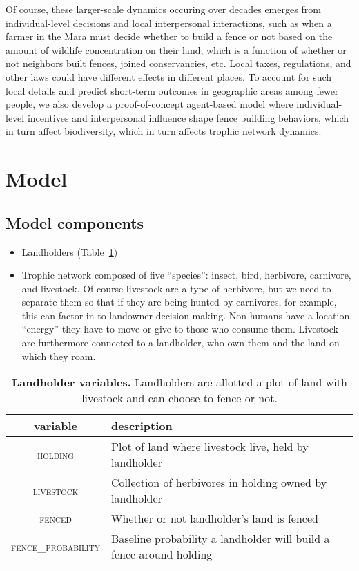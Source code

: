 \documentclass{article}
\theoremstyle{mytheorem}
\theoremstyle{myremark}
\begin{document}
Of course, these larger-scale dynamics occuring over decades emerges from
individual-level decisions and local interpersonal interactions, such as 
when a farmer in the Mara must decide whether to build a fence or not based on
the amount of wildlife concentration on their land, which is a function of whether or
not neighbors built fences, joined conservancies, etc. Local taxes,
regulations, and other laws could have different effects in different places.
To account for such local details and predict short-term outcomes in geographic areas
among fewer people, we also develop a proof-of-concept agent-based model where
individual-level incentives and interpersonal influence shape fence building
behaviors, which in turn affect biodiversity, which in turn affects trophic network
dynamics. 


\section{Model}
\label{sec:abm}

\subsection{Model components}

\begin{itemize}
  \item
    Landholders (Table~\ref{tab:landholders})
  \item 
    Trophic network composed of five ``species'': insect, bird, herbivore,
    carnivore, and livestock. Of course livestock are a type of herbivore, but
    we need to separate them so that if they are being hunted by carnivores,
    for example, this can factor in to landowner decision making. Non-humans
    have a location, ``energy'' they have to move or give to those who consume
    them. Livestock are furthermore connected to a landholder, who own them and
    the land on which they roam.
\end{itemize}

\begin{table}[h]
  \caption{\textbf{Landholder variables.} Landholders are allotted a plot of
  land with livestock and can choose to fence or not.}
  \label{tab:landholders}
  \begin{tabular}{cl} \toprule
    variable & description \\ \midrule  
    \textsc{holding} & Plot of land where livestock live, held by landholder \\
    \textsc{livestock} & Collection of herbivores in holding owned by landholder \\
    \textsc{fenced} & Whether or not landholder's land is fenced \\
    \textsc{fence\_probability} & Baseline probability a landholder will build a
    fence around holding \\
    \bottomrule
  \end{tabular} 
\end{table}
\end{document}
